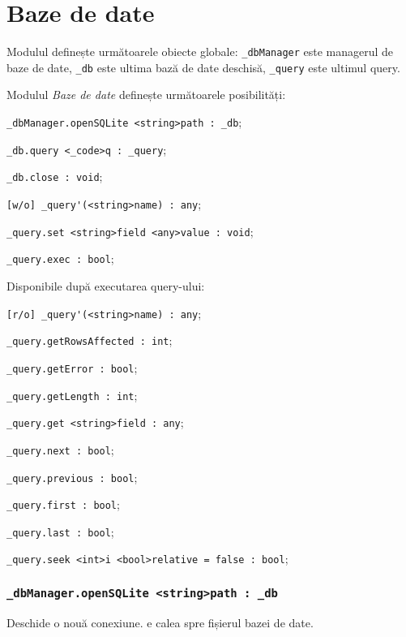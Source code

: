 \section{Baze de date}

Modulul definește următoarele obiecte globale: \lstinline|_dbManager| este managerul de baze de date, \lstinline|_db| este ultima bază de date deschisă, \lstinline|_query| este ultimul query.

Modulul \textit{Baze de date} definește următoarele posibilități:
\begin{icItems}
	\item \lstinline|_dbManager.openSQLite <string>path : _db|;
	\item \lstinline|_db.query <_code>q : _query|;
	\item \lstinline|_db.close : void|;
	\item \lstinline|[w/o] _query'(<string>name) : any|;
	\item \lstinline|_query.set <string>field <any>value : void|;
	\item \lstinline|_query.exec : bool|;
	\item Disponibile după executarea query-ului:
	\begin{icItems}
		\item \lstinline|[r/o] _query'(<string>name) : any|;
		\item \lstinline|_query.getRowsAffected : int|;
		\item \lstinline|_query.getError : bool|;
		\item \lstinline|_query.getLength : int|;
		\item \lstinline|_query.get <string>field : any|;
		\item \lstinline|_query.next : bool|;
		\item \lstinline|_query.previous : bool|;
		\item \lstinline|_query.first : bool|;
		\item \lstinline|_query.last : bool|;
		\item \lstinline|_query.seek <int>i <bool>relative = false : bool|;
	\end{icItems}
\end{icItems}

\subsubsection{\lstinline|_dbManager.openSQLite <string>path : _db|}

Deschide o nouă conexiune.  e calea spre fișierul bazei de date.

